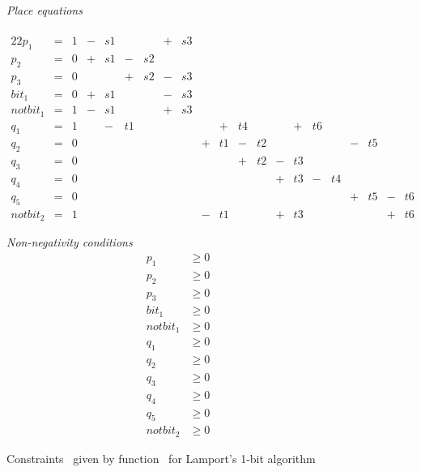 \begin{figure}
  \begin{minipage}{.79\columnwidth}
    \emph{Place equations} \\ \\[-2em]
    \begin{alignat*}{22}
         p_1   &{}={}& 1 &{}-{}& s1 &     &    &{}+{}& s3 &&&&&&&&&&&&& \\[-0.4em]
         p_2   &{}={}& 0 &{}+{}& s1 &{}-{}& s2 &     &    &&&&&&&&&&&&& \\[-0.4em]
         p_3   &{}={}& 0 &     &    &{}+{}& s2 &{}-{}& s3 &&&&&&&&&&&&& \\[-0.4em]
         bit_1 &{}={}& 0 &{}+{}& s1 &     &    &{}-{}& s3 &&&&&&&&&&&&& \\[-0.4em]
    notbit_1 &{}={}& 1 &{}-{}& s1 &     &    &{}+{}& s3 &&&&&&&&&&&&& \\[-0.4em]
         q_1   &{}={}& 1 &&{}-{}& t1 &     &    &     &    &{}+{}& t4 &     &    &{}+{}& t6 & \\[-0.4em]
         q_2   &{}={}& 0 &&&&&&&{}+{}& t1 &{}-{}& t2 &     &    &     &    &{}-{}& t5 &     &    & \\[-0.4em]
         q_3   &{}={}& 0 &&&&&&&     &    &{}+{}& t2 &{}-{}& t3 &     &    &     &    &     &    & \\[-0.4em]
         q_4   &{}={}& 0 &&&&&&&     &    &     &    &{}+{}& t3 &{}-{}& t4 &     &    &     &    & \\[-0.4em]
         q_5   &{}={}& 0 &&&&&&&     &    &     &    &     &    &     &    &{}+{}& t5 &{}-{}& t6 & \\[-0.4em]
    notbit_2 &{}={}& 1 &&&&&&&{}-{}& t1 &     &    &{}+{}& t3 &     &    &     &    &{}+{}& t6 &
    \end{alignat*}
  \end{minipage}
  \begin{minipage}{.19\columnwidth}
    \emph{Non-negativity conditions} \\[-2em]
    \begin{align*}
         p_1   & \ge 0 \\[-0.4em]
         p_2   & \ge 0 \\[-0.4em]
         p_3   & \ge 0 \\[-0.4em]
         bit_1 & \ge 0 \\[-0.4em]
      notbit_1 & \ge 0 \\[-0.4em]
         q_1   & \ge 0 \\[-0.4em]
         q_2   & \ge 0 \\[-0.4em]
         q_3   & \ge 0 \\[-0.4em]
         q_4   & \ge 0 \\[-0.4em]
         q_5   & \ge 0 \\[-0.4em]
      notbit_2 & \ge 0
    \end{align*}
  \end{minipage}
  \caption{Constraints \setC\ given by function \safety\ for
    Lamport's 1-bit algorithm}
\end{figure}
